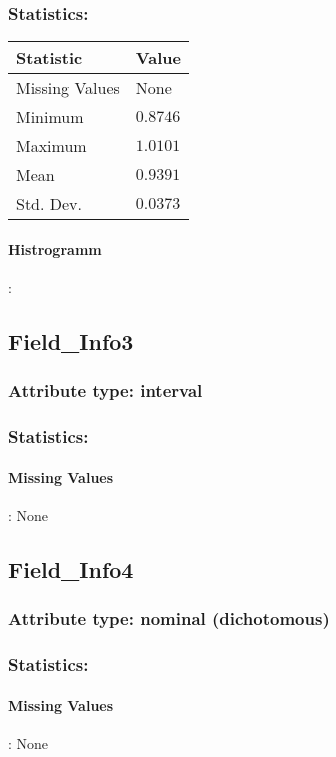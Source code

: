 \subsubsection{Statistics: }
\begin{table}[H]
	\renewcommand{\arraystretch}{1.25}
	\begin{tabular}{l|l}
		\textbf{Statistic} & \textbf{Value}\\\hline
Missing Values& None\\\hline
Minimum& $0.8746$\\\hline
Maximum& $1.0101$\\\hline
Mean& $0.9391$\\\hline
Std. Dev.& $0.0373$
	\end{tabular}
\end{table}

\paragraph{Histrogramm}:

\subsection{Field\_Info3}
\subsubsection{Attribute type: interval}
\subsubsection{Statistics: }
\paragraph{Missing Values}: None

\subsection{Field\_Info4}
\subsubsection{Attribute type: nominal (dichotomous)}
\subsubsection{Statistics: }
\paragraph{Missing Values}: None

